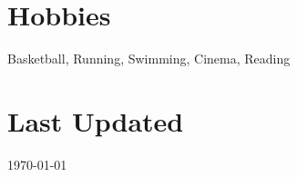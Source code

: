 \documentclass[margin]{res}
\begin{document}
\begin{resume}
\begin{comment}
\section{References \\ available \\ upon request}
\end{comment}

\section{Hobbies}
Basketball, Running, Swimming, Cinema, Reading

\section{Last Updated} \today

\end{resume}
\(\)
\end{document}
